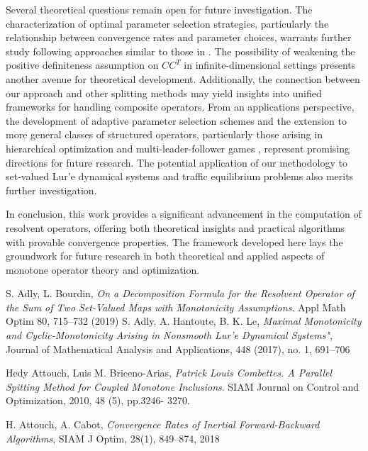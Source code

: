\documentclass[11pt]{article}
\theoremstyle{plain}
\begin{document}
{{Several theoretical questions remain open for future investigation. The characterization of optimal parameter selection strategies, particularly the relationship between convergence rates and parameter choices, warrants further study following approaches similar to those in \cite{Attouch1,Chen}. The possibility of weakening the positive definiteness assumption on $CC^T$ in infinite-dimensional settings presents another avenue for theoretical development. Additionally, the connection between our approach and other splitting methods \cite{Fukushima,Tseng} may yield insights into unified frameworks for handling composite operators. From an applications perspective, the development of adaptive parameter selection schemes and the extension to more general classes of structured operators, particularly those arising in hierarchical optimization and multi-leader-follower games \cite{Pang}, represent promising directions for future research. The potential application of our methodology to set-valued Lur'e dynamical systems {\cite{BT,L1} }and traffic equilibrium problems also merits further investigation.}

{In conclusion, this work provides a significant advancement in the computation of resolvent operators, offering both theoretical insights and practical algorithms with provable convergence properties. The framework developed here lays the groundwork for future research in both theoretical and applied aspects of monotone operator theory and optimization.}

\begin{thebibliography}{}



 { \sc S. Adly, L. Bourdin},  \textit{On a Decomposition Formula for the Resolvent Operator of the Sum of Two Set-Valued Maps with Monotonicity Assumptions}. Appl Math Optim 80, 715--732 (2019)
%
  { \sc S. Adly, A. Hantoute, B. K. Le}, \textit{Maximal Monotonicity and Cyclic-Monotonicity Arising in Nonsmooth Lur'e Dynamical Systems"}, Journal of Mathematical Analysis and Applications, 448 (2017), no. 1, 691--706



   {\sc Hedy Attouch, Luis M. Briceno-Arias}, \textit{Patrick Louis Combettes. A Parallel Spitting Method for
Coupled Monotone Inclusions}. SIAM Journal on Control and Optimization, 2010, 48 (5), pp.3246-
3270.

   {\sc  H. Attouch, A. Cabot}, \textit{Convergence Rates of Inertial Forward-Backward Algorithms}, SIAM J Optim, 28(1), 849--874, 2018


\end{thebibliography}}
\end{document}
